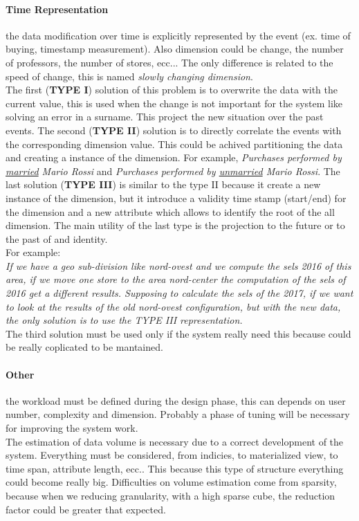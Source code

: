 \documentclass[12pt]{article}
\begin{document}
\paragraph{Time Representation} the data modification over time is explicitly represented by the event (ex. time of buying, timestamp measurement). Also dimension could be change, the number of professors, the number of stores, ecc... The only difference is related to the speed of change, this is named \textit{slowly changing dimension}.\\
The first (\textbf{TYPE I}) solution of this problem is to overwrite the data with the current value, this is used when the change is not important for the system like solving an error in a surname. This project the new situation over the past events. The second (\textbf{TYPE II}) solution is to directly correlate the events with the corresponding dimension value. This could be achived partitioning the data and creating a instance of the dimension. For example, \textit{Purchases performed by \underline{married} Mario Rossi} and \textit{Purchases performed by \underline{unmarried} Mario Rossi}.
The last solution (\textbf{TYPE III}) is similar to the type II because it create a new instance of the dimension, but it introduce a validity time stamp (start/end) for the dimension and a new attribute which allows to identify the root of the all dimension. The main utility of the last type is the projection to the future or to the past of and identity.\\

For example:\\
\textit{If we have a geo sub-division like nord-ovest and we compute the sels 2016 of this area, if we move one store to the area nord-center the computation of the sels of 2016 get a different results. Supposing to calculate the sels of the 2017, if we want to look at the results of the old nord-ovest configuration, but with the new data, the only solution is to use the TYPE III representation. }\\

The third solution must be used only if the system really need this because could be really coplicated to be mantained.

\paragraph{Other} the workload must be defined during the design phase, this can depends on user number, complexity and dimension. Probably a phase of tuning will be necessary for improving the system work.\\
The estimation of data volume is necessary due to a correct development of the system. Everything must be considered, from indicies, to materialized view, to time span, attribute length, ecc.. This because this type of structure everything could become really big. Difficulties on volume estimation come from sparsity, because when we reducing granularity, with a high sparse cube, the reduction factor could be greater that expected.
\end{document}
